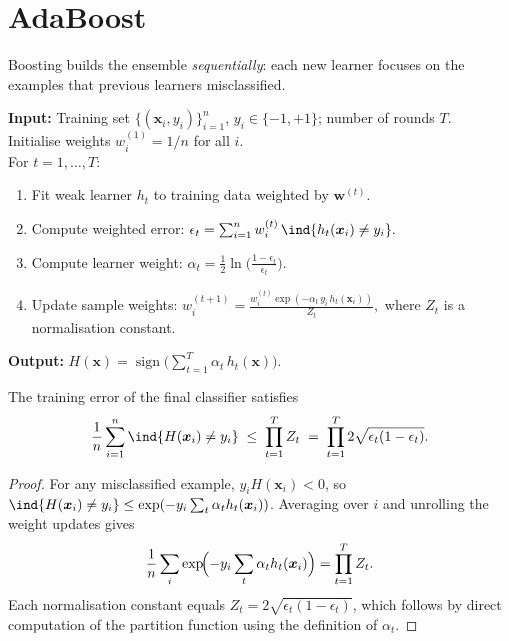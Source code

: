 \section{AdaBoost}

Boosting builds the ensemble \emph{sequentially}: each new learner focuses on the examples that previous learners misclassified.

\begin{algorithme}[title=\textbf{AdaBoost (Binary Classification)}]
\textbf{Input:} Training set $\{(\bm{x}_i,y_i)\}_{i=1}^n$, $y_i\in\{-1,+1\}$; number of rounds $T$.\\[4pt]
Initialise weights $w_i^{(1)}=1/n$ for all $i$.\\[2pt]
For $t=1,\dots,T$:
\begin{enumerate}
  \item Fit weak learner $h_t$ to training data weighted by $\bm{w}^{(t)}$.
  \item Compute weighted error:
    $\epsilon_t = \sum_{i=1}^n w_i^{(t)}\,\ind\{h_t(\bm{x}_i)\neq y_i\}.$
  \item Compute learner weight:
    $\alpha_t = \tfrac{1}{2}\ln\!\bigl(\frac{1-\epsilon_t}{\epsilon_t}\bigr).$
  \item Update sample weights:
    $w_i^{(t+1)} = \frac{w_i^{(t)}\exp(-\alpha_t\, y_i\, h_t(\bm{x}_i))}{Z_t},$
    where $Z_t$ is a normalisation constant.
\end{enumerate}
\textbf{Output:} $H(\bm{x})=\operatorname{sign}\!\bigl(\sum_{t=1}^T \alpha_t\, h_t(\bm{x})\bigr).$
\end{algorithme}

\begin{theorem}
The training error of the final classifier satisfies
\[
  \frac{1}{n}\sum_{i=1}^n \ind\{H(\bm{x}_i)\neq y_i\}
  \;\leq\; \prod_{t=1}^T Z_t
  \;=\; \prod_{t=1}^T 2\sqrt{\epsilon_t(1-\epsilon_t)}.
\]
\end{theorem}

\begin{proof}
For any misclassified example, $y_i H(\bm{x}_i)<0$, so $\ind\{H(\bm{x}_i)\neq y_i\}\leq \exp(-y_i\sum_t\alpha_t h_t(\bm{x}_i))$. Averaging over $i$ and unrolling the weight updates gives
\[
  \frac{1}{n}\sum_i \exp\!\Bigl(-y_i\sum_t \alpha_t h_t(\bm{x}_i)\Bigr)
  = \prod_{t=1}^T Z_t.
\]
Each normalisation constant equals $Z_t = 2\sqrt{\epsilon_t(1-\epsilon_t)}$, which follows by direct computation of the partition function using the definition of $\alpha_t$.
\end{proof}

